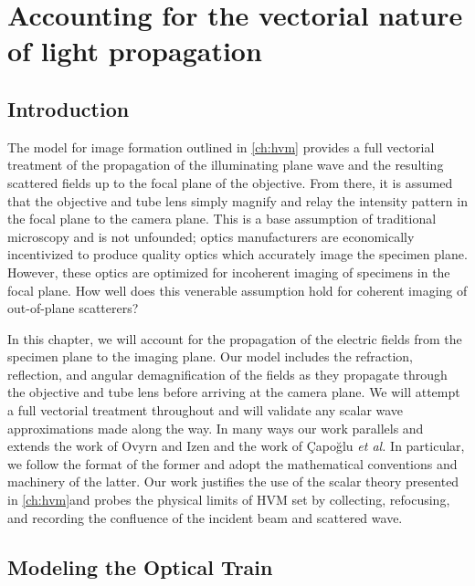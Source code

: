 \chapter{Accounting for the vectorial nature of light propagation}
\label{ch:debye}




\section{Introduction}

The model for image formation outlined in \autoref{ch:hvm} provides a full
vectorial treatment of the propagation of the illuminating plane wave and
the resulting scattered fields up to the focal plane of the objective.
From there, it is assumed that the
objective and tube lens simply magnify and relay the intensity pattern in
the focal plane to the camera plane.
This is a base assumption of traditional microscopy and is not unfounded; optics
manufacturers are economically incentivized to produce quality optics which
accurately image the specimen plane. However, these optics are optimized for
incoherent imaging of specimens in the focal plane.
How well does this venerable assumption hold for coherent imaging of out-of-plane
scatterers?

In this chapter, we will account for the propagation of the electric fields from
the specimen plane to the imaging plane. Our model includes the
refraction, reflection, and angular demagnification of the fields as they propagate
through the objective and tube lens before arriving at the camera plane.
We will attempt a full vectorial treatment throughout and will
validate any scalar wave approximations made along the way. In many ways our work
parallels and extends the work of Ovyrn and Izen\cite{izen00} and the work of
\c{C}apo\u{g}lu\cite{capoglu12} \emph{et al.} In particular, we follow the format of the
former and adopt the mathematical conventions and machinery of the latter.
Our work justifies the use of the scalar theory
presented in \autoref{ch:hvm}and probes the physical limits
of HVM set by collecting, refocusing, and recording the confluence of the incident
beam and scattered wave.


\section{Modeling the Optical Train}

